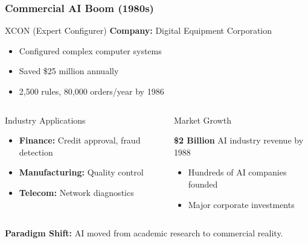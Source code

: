 \documentclass{beamer}
\begin{document}
\begin{frame}
    \frametitle{Commercial AI Boom (1980s)}
    \begin{block}{XCON (Expert Configurer)}
        \textbf{Company:} Digital Equipment Corporation
        \begin{itemize}
            \item Configured complex computer systems
            \item Saved \$25 million annually
            \item 2,500 rules, 80,000 orders/year by 1986
        \end{itemize}
    \end{block}
    
    \begin{columns}
        \begin{column}{0.48\textwidth}
            \begin{exampleblock}{Industry Applications}
                \begin{itemize}
                    \item \textbf{Finance:} Credit approval, fraud detection
                    \item \textbf{Manufacturing:} Quality control
                    \item \textbf{Telecom:} Network diagnostics
                \end{itemize}
            \end{exampleblock}
        \end{column}
        \begin{column}{0.48\textwidth}
            \begin{alertblock}{Market Growth}
                
                \textbf{\$2 Billion} AI industry revenue by 1988
                
                \begin{itemize}
                    \item Hundreds of AI companies founded
                    \item Major corporate investments
                \end{itemize}
            \end{alertblock}  
        \end{column}
    \end{columns}
    
    \textcolor{MyBlue}{\textbf{Paradigm Shift:}} AI moved from academic research to commercial reality.
\end{frame}
\end{document}
